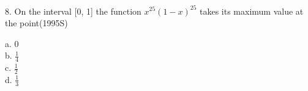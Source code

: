 \documentclass[journal,12pt,twocolumn]{IEEEtran}
\theoremstyle{remark}
\begin{document}
8.  On the interval [0, 1] the function $x^{25}(1-x)^{25}$ \indent takes 
its maximum value at the point\hspace{0.7cm}(1995S)\\ 
\begin{multicols}{4}
	a. 0 \\
	b. $\displaystyle\frac{1}{4}$ \\
	c. $\displaystyle\frac{1}{2}$ \\
	d. $\displaystyle\frac{1}{3}$
\end{multicols}
\newpage
\bigskip
\renewcommand{\thefigure}
{\theenumi}
\renewcommand{\thetable}
{\theenumi}
\end{document}
